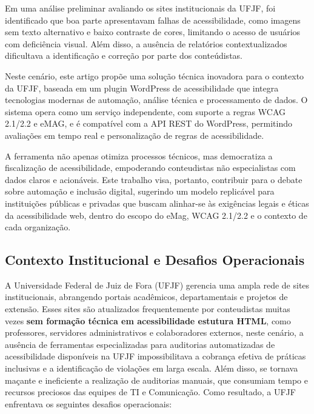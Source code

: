 \documentclass[12pt]{article}
\begin{document}
Em uma análise preliminar avaliando os sites institucionais da UFJF, foi
identificado que boa parte apresentavam falhas de acessibilidade, como imagens sem texto
alternativo e baixo contraste de cores, limitando o acesso de usuários com deficiência
visual. Além disso, a ausência de relatórios contextualizados dificultava a 
identificação e correção por parte dos conteúdistas.

Neste cenário, este artigo propõe uma solução técnica inovadora para o contexto
da UFJF, baseada em um plugin WordPress de acessibilidade que integra tecnologias
modernas de automação, análise técnica e processamento de dados. O sistema opera
como um serviço independente, com suporte a regras WCAG 2.1/2.2 e eMAG, e é
compatível com a API REST do WordPress, permitindo avaliações em tempo real e
personalização de regras de acessibilidade.

A ferramenta não apenas otimiza processos técnicos, mas democratiza a
fiscalização de acessibilidade, empoderando conteudistas não especialistas com
dados claros e acionáveis. Este trabalho visa, portanto, contribuir para o debate 
sobre automação e inclusão digital, sugerindo um modelo replicável para instituições
públicas e privadas que buscam alinhar-se às exigências legais e éticas da
acessibilidade web, dentro do escopo do eMag, WCAG 2.1/2.2 e o contexto de cada
organização.

\subsection{Contexto Institucional e Desafios Operacionais}\label{subsec:contexto}
A Universidade Federal de Juiz de Fora (UFJF) gerencia uma ampla rede de sites
institucionais, abrangendo portais acadêmicos, departamentais e projetos de extensão.
Esses sites são atualizados frequentemente por conteudistas muitas vezes\textbf{ sem formação 
técnica em acessibilidade estutura HTML}, como professores, servidores administrativos e
colaboradores externos, neste cenário, a ausência de ferramentas especializadas para auditorias 
automatizadas de acessibilidade disponíveis na UFJF impossibilitava a cobrança efetiva de
práticas inclusivas e a identificação de violações em larga escala. Além disso, se tornava
maçante e ineficiente a realização de auditorias manuais, que consumiam tempo e recursos
preciosos das equipes de TI e Comunicação. Como resultado, a UFJF enfrentava os seguintes
desafios operacionais: 
\end{document}
